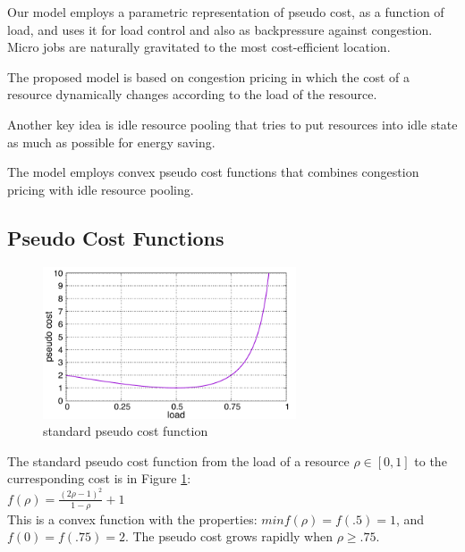 

Our model employs a parametric representation of pseudo cost, as a
function of load, and uses it for load control and also as
backpressure against congestion.
Micro jobs are naturally gravitated to the most cost-efficient
location.

The proposed model is based on congestion pricing in which the cost of
a resource dynamically changes according to the load of the resource.

Another key idea is idle resource pooling that tries to put resources
into idle state as much as possible for energy saving.

The model employs convex pseudo cost functions that combines congestion
pricing with idle resource pooling.

\subsection{Pseudo Cost Functions}

\begin{figure}[thb]
\begin{center}
\includegraphics[width=7.5cm,clip]{costfunc.pdf}
\vspace{-2.0ex}
\caption{standard pseudo cost function}
\label{fig:std_costfunc}
\end{center}
\end{figure}

The standard pseudo cost function from the load of a resource
$\rho \in [0, 1]$ to the curresponding cost is in Figure
\ref{fig:std_costfunc}: \\

\( f(\rho) = \frac{(2\rho - 1)^{2}}{1 - \rho} + 1  \) \\

This is a convex function with the properties:
$min f(\rho) = f(.5) = 1$, and $f(0) = f(.75) = 2$.
The pseudo cost grows rapidly when $\rho \ge .75$.

